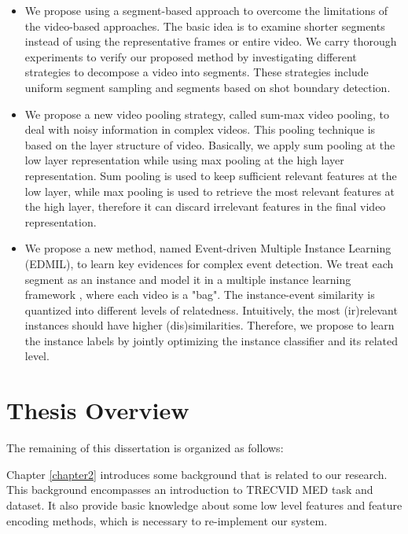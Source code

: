 \begin{itemize}
\item We propose using a segment-based approach to overcome the limitations of  the video-based approaches. The basic idea is to examine shorter segments instead of using the representative frames or entire video. We carry thorough experiments to verify our proposed method by investigating different strategies to decompose a video into segments. These strategies include uniform segment sampling and segments based on shot boundary detection.

\item We propose a new video pooling strategy, called sum-max video pooling, to deal with noisy information in complex videos. This pooling technique is based on the layer structure of video. Basically, we apply sum pooling at the low layer representation while using max pooling at the high layer representation. Sum pooling is used to keep sufficient relevant features at the low layer, while max pooling is used to retrieve the most relevant features at the high layer, therefore it can discard irrelevant features in the final video representation. 
	
\item We propose a new method, named  Event-driven Multiple Instance Learning (EDMIL), to learn key evidences for complex event detection. We treat each segment as an instance and model it in a multiple instance learning framework \cite{andrews2002support}, where each video is a "bag". The instance-event similarity is quantized into different levels of relatedness. Intuitively, the most (ir)relevant instances should have higher (dis)similarities. Therefore, we propose to learn the instance labels by jointly optimizing the instance classifier and its related level.
	
\end{itemize}

\section{Thesis Overview}


The remaining of this dissertation is organized as follows:

Chapter \ref{chapter2} introduces some background that is related to our research. This background encompasses an introduction to TRECVID MED task and dataset. It also provide basic knowledge about some low level features and feature encoding methods, which is necessary to re-implement our system. 

